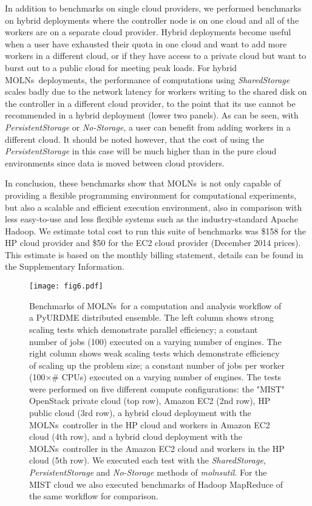\documentclass[final,leqno,onefignum,onetabnum]{siamltex1213}
\def\packagename {MOLNs}
\begin{document}
In addition to benchmarks on single cloud providers, we performed benchmarks on hybrid deployments where the controller node is on one cloud and all of the workers are on a separate cloud provider.  Hybrid deployments become useful when a user have exhausted their quota in one cloud and want to add more workers in a different cloud, or if they have access to a private cloud but want to burst out to a public cloud for meeting peak loads. For hybrid \packagename~deployments, the performance of computations using \emph{SharedStorage} scales badly due to the network latency for workers writing to the shared disk on the controller in a different cloud provider, to the point that its use cannot be recommended in a hybrid deployment (lower two panels). As can be seen, with \emph{PersistentStorage} or \emph{No-Storage}, a user can benefit from adding workers in a different cloud. It should be noted however, that the cost of using the \emph{PersistentStorage} in this case will be much higher than in the pure cloud environments since data is moved between cloud providers. 


In conclusion, these benchmarks show that \packagename~is not only capable of providing a flexible programming environment for computational experiments, but also a scalable and efficient execution environment, also in comparison with less easy-to-use and less flexible systems such as the  industry-standard Apache Hadoop. 
We estimate total cost to run this suite of benchmarks was \$158 for the HP cloud provider and \$50 for the EC2 cloud provider (December 2014 prices). This estimate is based on the monthly billing statement, details can be found in the Supplementary Information.


\begin{figure}[htpb]
\begin{center}
\texttt{[image: fig6.pdf]}
\end{center}
\caption{
Benchmarks of \packagename~for a computation and analysis workflow of a PyURDME distributed ensemble.  The left column shows strong scaling tests which demonstrate parallel efficiency; a constant number of jobs (100) executed on a varying number of engines.  The right column shows weak scaling tests which demonstrate efficiency of scaling up the problem size; a constant number of jobs per worker (100$\times\#$ CPUs) executed on a varying number of engines. The tests were performed on five different compute configurations: the "MIST" OpenStack private cloud (top row), Amazon EC2 (2nd row), HP public cloud (3rd row), a hybrid cloud deployment with the \packagename~controller in the HP cloud and workers in Amazon EC2 cloud (4th row), and a hybrid cloud deployment with the \packagename~controller in the Amazon EC2 cloud and workers in the HP cloud (5th row).  We executed each test with the \emph{SharedStorage}, \emph{PersistentStorage} and \emph{No-Storage} methods of \emph{molnsutil}.  For the MIST cloud we also executed benchmarks of Hadoop MapReduce of the same workflow for comparison.
}
\label{fig:benchmarks}
\end{figure}
\end{document}

